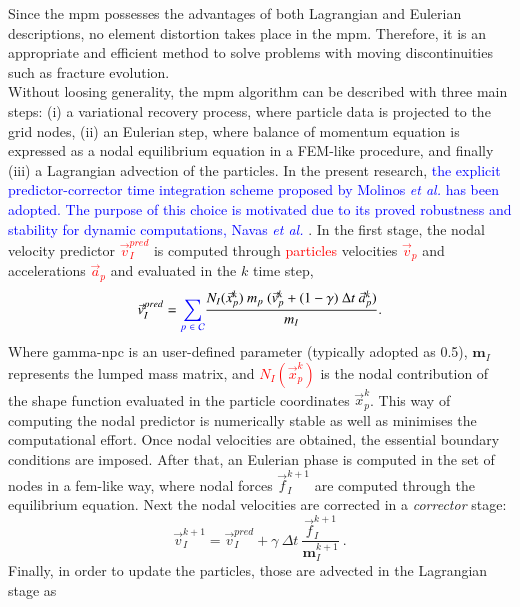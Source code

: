 \documentclass[preprint,12pt,a4paper]{elsarticle}
\newcommand{\tens}[1]{
  \ensuremath{\mathbf{{#1}}}
}
\begin{document}
Since the \acrshort{mpm} possesses the advantages of both Lagrangian and Eulerian descriptions, no  element distortion takes place in the \acrshort{mpm}. Therefore, it is an appropriate and efficient method
to solve problems with moving discontinuities such as fracture evolution.\\
Without loosing generality, the \acrshort{mpm} algorithm
can be described with three main steps: (i) a variational recovery
process, where particle data is projected to the grid nodes, (ii) an
Eulerian step, where balance of momentum equation is expressed as a
nodal equilibrium equation in a FEM-like procedure, and finally
(iii) a Lagrangian advection of the particles. In the present research,
\textcolor{blue}{the explicit predictor-corrector time integration scheme proposed by Molinos {\it et al.} \cite{Molinos2020} has been adopted. The purpose of this choice is motivated due to its proved robustness and stability for dynamic computations, Navas {\it et al.} \cite{Navas2018a}}. In the first stage, the nodal velocity predictor \textcolor{red}{$ \vec{v}_{I}^{pred}$} is computed through
\textcolor{red}{particles} velocities \textcolor{red}{$\vec{v}_p$} and accelerations \textcolor{red}{$\vec{a}_p$} and evaluated
in the $k$ time step,
\begin{equation}
 \label{eq:Predictor-velocity}
    \vec{v}_{I}^{pred} =  \textcolor{blue}{\sum_{p\ \in\ \mathcal{C}}} \frac{ N_{I}(\vec{x}_p^k )\ m_p\ (\vec{v}_p^k + (1 - \gamma)\ \Delta t\ \vec{a}_p^k)}{m_I}.
\end{equation}
Where \gls{gamma-npc} is an user-defined parameter (typically adopted as
0.5), $\tens{m}_I$ represents the lumped mass matrix, and \textcolor{red}{$N_{I}(\vec{x}_p^k) $} is the nodal contribution of the shape function evaluated in the particle
coordinates $\vec{x}_p^k$. This way of computing the nodal predictor is numerically stable
as well as minimises the computational effort. Once nodal velocities are
obtained, the essential boundary conditions are imposed. After that, an
Eulerian phase is computed in the set of nodes in a
\acrshort{fem}-like way, where nodal forces $\vec{f}_{I}^{k+1}$ are
computed through the equilibrium equation. Next the nodal velocities
are corrected in a \textit{corrector} stage:
\begin{equation}
  \label{eq:Corrector-velocity}
  \vec{v}_{I}^{k+1} = \vec{v}_{I}^{pred} + \gamma\ \Delta t\
  \frac{\vec{f}_{I}^{k+1}}{\tens{m}_I^{k+1}}\ .
\end{equation}
Finally, in order to update the particles, those are advected in the Lagrangian stage as
\end{document}
